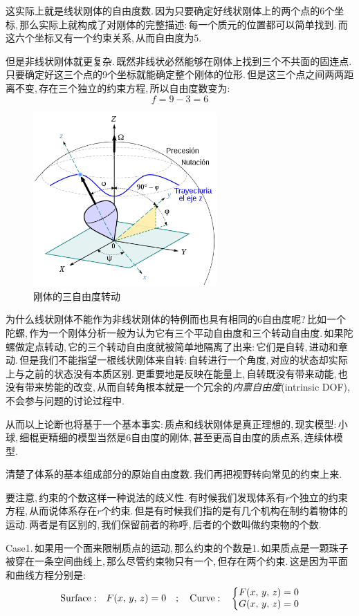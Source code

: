 这实际上就是线状刚体的自由度数.\,因为只要确定好线状刚体上的两个点的$6$个坐标,\,那么实际上就构成了对刚体的完整描述:\,每一个质元的位置都可以简单找到.\,而这六个坐标又有一个约束关系,\,从而自由度为5.

但是非线状刚体就更复杂.\,既然非线状必然能够在刚体上找到三个不共面的固连点.\,只要确定好这三个点的9个坐标就能确定整个刚体的位形.\,但是这三个点之间两两距离不变,\,存在三个独立的约束方程,\,所以自由度数变为:
\[f=9-3=6\]

\begin{figure}
\centering
\includegraphics[width=7cm]{image/6-2-2.png}
\caption{刚体的三自由度转动}
\end{figure}
为什么线状刚体不能作为非线状刚体的特例而也具有相同的6自由度呢?\,比如一个陀螺,\,作为一个刚体分析一般为认为它有三个平动自由度和三个转动自由度.\,如果陀螺做定点转动,\,它的三个转动自由度就被简单地隔离了出来:\,它们是自转,\,进动和章动.\,但是我们不能指望一根线状刚体来自转:\,自转进行一个角度,\,对应的状态却实际上与之前的状态没有本质区别.\,更重要地是反映在能量上,\,自转既没有带来动能,\,也没有带来势能的改变,\,从而自转角根本就是一个冗余的\emph{内禀自由度}(intrinsic DOF),\,不会参与问题的讨论过程中.

从而以上论断也将基于一个基本事实:\,质点和线状刚体是真正理想的,\,现实模型:\,小球,\,细棍更精细的模型当然是6自由度的刚体,\,甚至更高自由度的质点系,\,连续体模型.

清楚了体系的基本组成部分的原始自由度数.\,我们再把视野转向常见的约束上来.

要注意,\,约束的个数这样一种说法的歧义性.\,有时候我们发现体系有$r$个独立的约束方程,\,从而说体系存在$r$个约束.\,但是有时候我们指的是有几个机构在制约着物体的运动.\,两者是有区别的,\,我们保留前者的称呼,\,后者的个数叫做约束物的个数.

Case1.\,如果用一个面来限制质点的运动,\,那么约束的个数是1.\,如果质点是一颗珠子被穿在一条空间曲线上,\,那么尽管约束物只有一个,\,但存在两个约束.\,这是因为平面和曲线方程分别是:
\[{\rm Surface:} \quad F(x,\,y,\,z)=0 \quad;\quad {\rm Curve:} \quad \left\{ \begin{matrix} F(x,\,y,\,z)=0\\ G(x,\,y,\,z)=0\end{matrix}\right.\]

